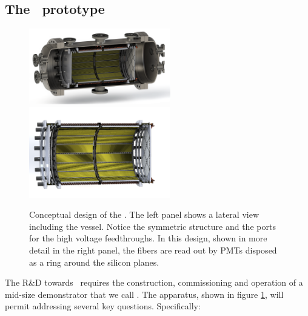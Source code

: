 \subsection{The \HDEMO\ prototype}

\begin{figure}
  \begin{center}
    \includegraphics[width=0.55\textwidth]{img2/nhd_vessel_render1.png}
    \includegraphics[width=0.55\textwidth]{img2/nhd_view_render.png}
    \caption{Conceptual design of the \HDEMO. The left panel shows a lateral view including the vessel. Notice the symmetric structure and the ports for
    the high voltage feedthroughs. In this design, shown in more detail in the right panel, the fibers are read out by PMTs disposed as a ring around the silicon planes.} 
    \label{fig.hdemo}
  \end{center}
\end{figure}


\indent


The R\&D towards \NHD\ requires the construction, commissioning and operation of a mid-size demonstrator that we call \HDEMO. The apparatus, shown in figure \ref{fig.hdemo}, will permit addressing several key questions. Specifically:

\indent


